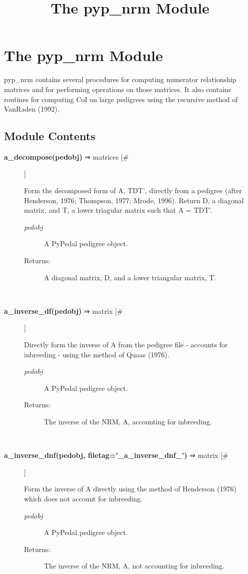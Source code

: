 \documentclass[10pt]{article}
\title{The pyp\_nrm Module}
\begin{document}
\section*{The pyp\_nrm Module}


 pyp\_nrm contains several procedures for computing numerator relationship matrices and for performing operations on those matrices. It also contains routines for computing CoI on large pedigrees using the recursive method of VanRaden (1992).
\subsection*{Module Contents}
\begin{description}
\item[\textbf{a\_decompose(pedobj)}
 ⇒ matrices [\#]]

 Form the decomposed form of A, TDT', directly from a pedigree (after Henderson, 1976; Thompson, 1977; Mrode, 1996). Return D, a diagonal matrix, and T, a lower triagular matrix such that A = TDT'.
\begin{description}
\item[\emph{pedobj}
] A PyPedal pedigree object.
\item[Returns:] A diagonal matrix, D, and a lower triangular matrix, T.

\end{description}
\\ 

\item[\textbf{a\_inverse\_df(pedobj)}
 ⇒ matrix [\#]]

 Directly form the inverse of A from the pedigree file - accounts for inbreeding - using the method of Quaas (1976).
\begin{description}
\item[\emph{pedobj}
] A PyPedal pedigree object.
\item[Returns:] The inverse of the NRM, A, accounting for inbreeding.

\end{description}
\\ 

\item[\textbf{a\_inverse\_dnf(pedobj, filetag='\_a\_inverse\_dnf\_')}
 ⇒ matrix [\#]]

 Form the inverse of A directly using the method of Henderson (1976) which does not account for inbreeding.
\begin{description}
\item[\emph{pedobj}
] A PyPedal pedigree object.
\item[Returns:] The inverse of the NRM, A, not accounting for inbreeding.


\end{description}
\end{description}
\end{document}
